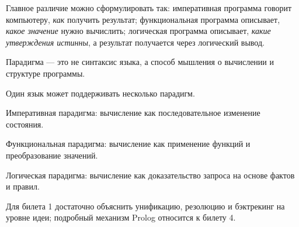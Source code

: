 Главное различие можно сформулировать так: императивная программа говорит компьютеру, \textit{как} получить результат; функциональная программа описывает, \textit{какое значение} нужно вычислить; логическая программа описывает, \textit{какие утверждения истинны}, а результат получается через логический вывод.

\begin{important}
    \item Парадигма --- это не синтаксис языка, а способ мышления о вычислении и структуре программы.
    \item Один язык может поддерживать несколько парадигм.
    \item Императивная парадигма: вычисление как последовательное изменение состояния.
    \item Функциональная парадигма: вычисление как применение функций и преобразование значений.
    \item Логическая парадигма: вычисление как доказательство запроса на основе фактов и правил.
    \item Для билета 1 достаточно объяснить унификацию, резолюцию и бэктрекинг на уровне идеи; подробный механизм Prolog относится к билету 4.
\end{important}
